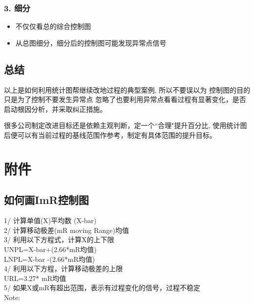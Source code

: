 \hypertarget{ux7ec6ux5206}{%
\subsubsection{3. 细分}\label{ux7ec6ux5206}}

\begin{itemize}
\tightlist
\item
  不仅仅看总的综合控制图
\item
  从总图细分，细分后的控制图可能发现异常点信号
\end{itemize}

\begin{description}
\item[]
\end{description}

\hypertarget{ux603bux7ed3}{%
\subsection{总结}\label{ux603bux7ed3}}

以上是如何利用统计图帮继续改地过程的典型案例, 所以不要误以为
控制图的目的只是为了控制不要发生异常点
忽略了也要利用异常点看看过程有显著变化，是否启动根因分析，并采取纠正措施。

很多公司制定改进目标还是依赖主观判断，定一个``合理"提升百分比,
使用统计图后便可以有当前过程的基线范围作参考，制定有具体范围的提升目标。

\hypertarget{ux9644ux4ef6}{%
\section{附件}\label{ux9644ux4ef6}}

\hypertarget{ux5982ux4f55ux753bimrux63a7ux5236ux56fe}{%
\subsection{如何画ImR控制图}\label{ux5982ux4f55ux753bimrux63a7ux5236ux56fe}}

1/ 计算单值(X)平均数 (X-bar)\\
2/ 计算移动极差(mR moving Range)均值\\
3/ 利用以下方程式，计算X的上下限\\
UNPL=X-bar+(2.66*mR均值)\\
LNPL=X-bar -(2.66*mR均值)\\
4/ 利用以下方程，计算移动极差的上限\\
URL=3.27* mR均值\\
5/ 如果X或mR有超出范围，表示有过程变化的信号，过程不稳定\\
Note:

